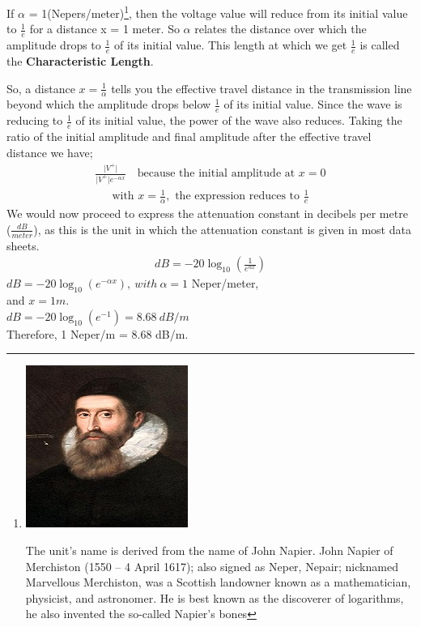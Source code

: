 If $\alpha$ = 1(Nepers/meter)\footnote{
\includegraphics[scale=0.2]{./graphics/johnnapier2}

The unit's name is derived from the name of John Napier. John Napier of Merchiston (1550 – 4 April 1617); also signed as Neper, Nepair; nicknamed Marvellous Merchiston, was a Scottish landowner known as a mathematician, physicist, and astronomer. He is best known as the discoverer of logarithms, he also invented the so-called \textquotesingle\textquotesingle Napier's bones\textquotesingle\textquotesingle}, then the voltage value will reduce from its initial value to $\frac{1}{e}$ for a distance x = 1 meter. So $\alpha$ relates the distance over which the amplitude drops to $\frac{1}{e}$ of its initial value. This length at which we get $\frac{1}{e}$ is called the \textbf{Characteristic Length}. 

So, a distance $x = \frac{1}{\alpha}$ tells you the effective travel distance in the transmission line beyond which the amplitude drops below $\frac{1}{e}$ of its initial value. Since the wave is reducing to $\frac{1}{e}$ of its initial value, the power of the wave also reduces. Taking the ratio of the initial amplitude and final amplitude after the effective travel distance we have;
\begin{align*}
 \frac{\lvert V^+\rvert}{\lvert V^+\rvert e ^{-\alpha x}} \quad \text{because the initial amplitude at } x = 0
\end{align*}
\begin{align*}
\text{with }x = \frac{1}{\alpha},\text{ the expression reduces to }\frac{1}{e}
\end{align*}
We would now proceed to express the attenuation constant in decibels per metre ($\frac{dB}{meter}$), as this is the unit in which the attenuation constant is given in most data sheets.
\begin{align*}
dB = -20\log_{10}(\frac{1}{e^{\alpha x}})
\end{align*}
$ dB = -20\log_{10}(e^{-\alpha x}), \ with \ \alpha = 1 $ Neper/meter,\\ and $ x = 1m $. \\
$ dB = -20\log_{10}(e^{-1}) = 8.68\ dB/m  $\\
Therefore, 1 Neper/m = 8.68 dB/m.\\

